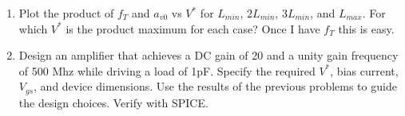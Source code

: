\begin{enumerate}
\item {\color{blue}Plot the product of $f_T$ and $a_{v0}$ vs $V^*$ for $L_{min}$, $2 L_{min}$, $3 L_{min}$, and $L_{max}$. For which $V^*$ is the product maximum for each case?}
    Once I have $f_T$ this is easy.

\item {\color{blue} Design an amplifier that achieves a DC gain of 20 and a unity gain frequency of 500 Mhz while driving a load of 1pF. Specify the required $V^*$, bias current, $V_{gs}$, and device dimensions. Use the results of the previous problems to guide the design choices. Verify with SPICE.}
\end{enumerate}

